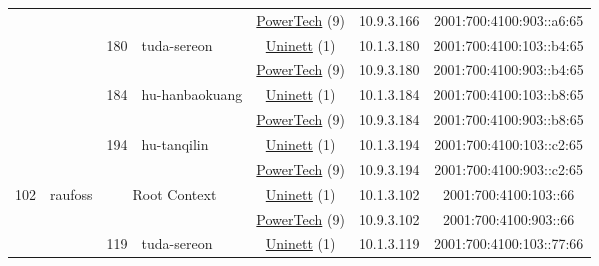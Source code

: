 \begin{small}
\begin{center}
\begin{longtable}{|c|c|c|c|c|c|c|c|}
  &  &  &  & \multicolumn{2}{|c|}{\tiny{\href{http://www.powertech.no}{PowerTech} (9)}} & \tiny{10.9.3.166} & \tiny{2001:700:4100:903::a6:65} \\* \cline{3-3}\cline{4-4}\cline{5-5}\cline{6-6}\cline{7-7}\cline{8-8}
  &  & \multirow{2}{*}{\tiny{180}} & \multicolumn{1}{|l|}{\multirow{2}{*}{\tiny{tuda-sereon}}} & \multicolumn{2}{|c|}{\tiny{\href{https://www.uninett.no}{Uninett} (1)}} & \tiny{10.1.3.180} & \tiny{2001:700:4100:103::b4:65} \\* \cline{5-5}\cline{6-6}\cline{7-7}\cline{8-8}
  &  &  &  & \multicolumn{2}{|c|}{\tiny{\href{http://www.powertech.no}{PowerTech} (9)}} & \tiny{10.9.3.180} & \tiny{2001:700:4100:903::b4:65} \\* \cline{3-3}\cline{4-4}\cline{5-5}\cline{6-6}\cline{7-7}\cline{8-8}
  &  & \multirow{2}{*}{\tiny{184}} & \multicolumn{1}{|l|}{\multirow{2}{*}{\tiny{hu-hanbaokuang}}} & \multicolumn{2}{|c|}{\tiny{\href{https://www.uninett.no}{Uninett} (1)}} & \tiny{10.1.3.184} & \tiny{2001:700:4100:103::b8:65} \\* \cline{5-5}\cline{6-6}\cline{7-7}\cline{8-8}
  &  &  &  & \multicolumn{2}{|c|}{\tiny{\href{http://www.powertech.no}{PowerTech} (9)}} & \tiny{10.9.3.184} & \tiny{2001:700:4100:903::b8:65} \\* \cline{3-3}\cline{4-4}\cline{5-5}\cline{6-6}\cline{7-7}\cline{8-8}
  &  & \multirow{2}{*}{\tiny{194}} & \multicolumn{1}{|l|}{\multirow{2}{*}{\tiny{hu-tanqilin}}} & \multicolumn{2}{|c|}{\tiny{\href{https://www.uninett.no}{Uninett} (1)}} & \tiny{10.1.3.194} & \tiny{2001:700:4100:103::c2:65} \\* \cline{5-5}\cline{6-6}\cline{7-7}\cline{8-8}
  &  &  &  & \multicolumn{2}{|c|}{\tiny{\href{http://www.powertech.no}{PowerTech} (9)}} & \tiny{10.9.3.194} & \tiny{2001:700:4100:903::c2:65} \\ \hline
 \multirow{20}{*}{\tiny{102}} & \multicolumn{1}{|l|}{\multirow{20}{*}{\tiny{raufoss}}} & \multicolumn{2}{|c|}{\multirow{2}{*}{\tiny{Root Context}}} & \multicolumn{2}{|c|}{\tiny{\href{https://www.uninett.no}{Uninett} (1)}} & \tiny{10.1.3.102} & \tiny{2001:700:4100:103::66} \\* \cline{5-5}\cline{6-6}\cline{7-7}\cline{8-8}
  &  & \multicolumn{2}{|c|}{} & \multicolumn{2}{|c|}{\tiny{\href{http://www.powertech.no}{PowerTech} (9)}} & \tiny{10.9.3.102} & \tiny{2001:700:4100:903::66} \\* \cline{3-3}\cline{4-4}\cline{5-5}\cline{6-6}\cline{7-7}\cline{8-8}
  &  & \multirow{2}{*}{\tiny{119}} & \multicolumn{1}{|l|}{\multirow{2}{*}{\tiny{tuda-sereon}}} & \multicolumn{2}{|c|}{\tiny{\href{https://www.uninett.no}{Uninett} (1)}} & \tiny{10.1.3.119} & \tiny{2001:700:4100:103::77:66} \\* \cline{5-5}\cline{6-6}\cline{7-7}\cline{8-8}

\end{longtable}
\end{center}
\end{small}
